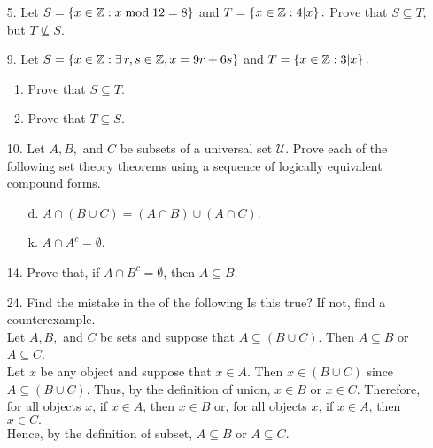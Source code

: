 \documentclass[a4paper, 12pt]{../../config/homework}
\begin{document}
\begin{enumerate}
\pagebreak
\item[5.] Let $S=\left\{x\in\mathbb{Z}:x\;\text{mod}\;12=8\right\}$ and $T=\left\{x\in\mathbb{Z}:4|x\right\}.$ Prove that $S\subseteq T$, but $T\nsubseteq S.$

\item[9.] Let $S=\left\{x\in\mathbb{Z}:\exists\,r,s\in\mathbb{Z},x=9r+6s\right\}$ and $T=\left\{x\in\mathbb{Z}:3|x\right\}.$
\begin{enumerate}[label=\alph*)]
\item Prove that $S\subseteq T$.
\item Prove that $T \subseteq S$.
\end{enumerate}

\item[10.] Let $A,B,$ and $C$ be subsets of a universal set $\mathcal{U}$. Prove each of the following set theory theorems using a sequence of logically equivalent compound forms.
\begin{enumerate}
\item[d.] $A \cap \left(B \cup C\right) = \left(A \cap B\right)\cup\left(A\cap C\right).$
\item[k.] $A\cap A^c=\emptyset.$
\end{enumerate}

\item[14.] Prove that, if $A\cap B^c=\emptyset$, then $A\subseteq B$.

\item[24.] Find the mistake in the  of the following  Is this  true? If not, find a counterexample.
\\ Let $A,B,$ and $C$ be sets and suppose that $A\subseteq (B \cup C)$. Then $A\subseteq B$ or $A\subseteq C$.
\\ Let $x$ be any object and suppose that $x\in A$. Then $x\in (B\cup C)$ since $A\subseteq (B \cup C).$ Thus, by the definition of union, $x\in B$ or $x\in C$. Therefore, for all objects $x$, if $x\in A$, then $x\in B$ or, for all objects $x$, if $x\in A$, then $x\in C.$
\\Hence, by the definition of subset, $A\subseteq B$ or $A\subseteq C$.
\end{enumerate}
\end{document}
